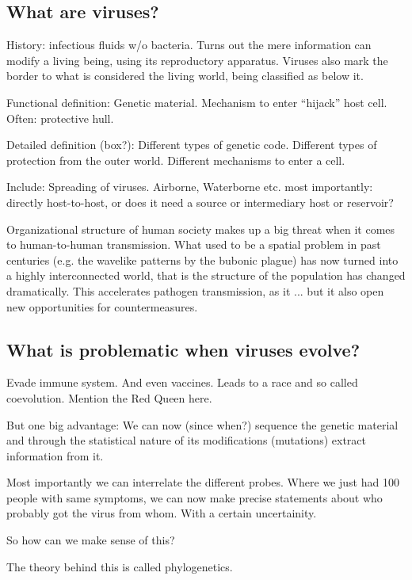 \documentclass[12pt]{scrartcl}
\begin{document}
    \subsection{What are viruses?}

    History: infectious fluids w/o bacteria. Turns out the mere information can modify a living being, using its reproductory apparatus. Viruses also mark the border to what is considered the living world, being classified as below it.

    Functional definition: Genetic material. Mechanism to enter ``hijack'' host cell. Often: protective hull.

    Detailed definition (box?): Different types of genetic code. Different types of protection from the outer world. Different mechanisms to enter a cell.

    Include: Spreading of viruses. Airborne, Waterborne etc. most importantly: directly host-to-host, or does it need a source or intermediary host or reservoir?

    Organizational structure of human society makes up a big threat when it comes to human-to-human transmission. What used to be a spatial problem in past centuries (e.g. the wavelike patterns by the bubonic plague) has now turned into a highly interconnected world, that is the structure of the population has changed dramatically. This accelerates pathogen transmission, as it ... but it also open new opportunities for countermeasures.

    \subsection{What is problematic when viruses evolve?}

    Evade immune system. And even vaccines. Leads to a race and so called coevolution. Mention the Red Queen here.

    But one big advantage: We can now (since when?) sequence the genetic material and through the statistical nature of its modifications (mutations) extract information from it.

    Most importantly we can interrelate the different probes. Where we just had 100 people with same symptoms, we can now make precise statements about who probably got the virus from whom. With a certain uncertainity.

    So how can we make sense of this?

    The theory behind this is called phylogenetics.
\end{document}
